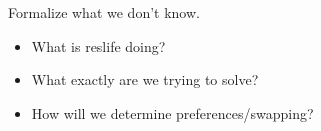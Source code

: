 \documentclass[12pt]{article}
\begin{document}
Formalize what we don't know.
\begin{itemize}
\item What is reslife doing?
\item What exactly are we trying to solve?
\item How will we determine preferences/swapping?
\end{itemize}







\end{document}
